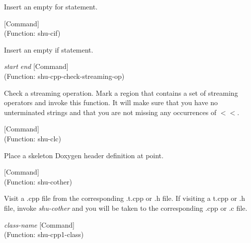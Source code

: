 \begin{doc-string}
Insert an empty for statement.
\end{doc-string}

\vspace{1em}
\noindent
{}
\usebox{\funcname}
 \hfill [Command]\\%
 (Function: shu-cif)

\begin{doc-string}
Insert an empty if statement.
\end{doc-string}

\vspace{1em}
\noindent
{}
\usebox{\funcname}\emph{start} \emph{end}
 \hfill [Command]\\%
 (Function: shu-cpp-check-streaming-op)

\begin{doc-string}
Check a streaming operation.   Mark a region that contains a set of streaming
operators and invoke this function.  It will make sure that you have no unterminated
strings and that you are not missing any occurrences of $<$$<$.
\end{doc-string}

\vspace{1em}
\noindent
{}
\usebox{\funcname}
 \hfill [Command]\\%
 (Function: shu-clc)

\begin{doc-string}
Place a skeleton Doxygen header definition at point.
\end{doc-string}

\vspace{1em}
\noindent
{}
\usebox{\funcname}
 \hfill [Command]\\%
 (Function: shu-cother)

\begin{doc-string}
Visit a .cpp file from the corresponding .t.cpp or .h file.  If visiting a t.cpp or .h
file, invoke \emph{shu-cother} and you will be taken to the corresponding .cpp or .c file.
\end{doc-string}

\vspace{1em}
\noindent
{}
\usebox{\funcname}\emph{class-name}
 \hfill [Command]\\%
 (Function: shu-cpp1-class)

